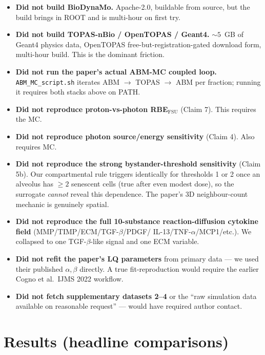 \documentclass[11pt]{article}
\begin{document}
\begin{itemize}
  \item \textbf{Did not build BioDynaMo.} Apache-2.0, buildable from
        source, but the build brings in ROOT and is multi-hour on
        first try.
  \item \textbf{Did not build TOPAS-nBio / OpenTOPAS / Geant4.} $\sim 5$~GB
        of Geant4 physics data, OpenTOPAS free-but-registration-gated
        download form, multi-hour build. This is the dominant friction.
  \item \textbf{Did not run the paper's actual ABM-MC coupled loop.}
        \texttt{ABM\_MC\_script.sh} iterates ABM $\rightarrow$ TOPAS
        $\rightarrow$ ABM per fraction; running it requires both stacks
        above on PATH.
  \item \textbf{Did not reproduce proton-vs-photon RBE$_{\mathrm{FSU}}$}
        (Claim 7). This requires the MC.
  \item \textbf{Did not reproduce photon source/energy sensitivity}
        (Claim 4). Also requires MC.
  \item \textbf{Did not reproduce the strong bystander-threshold
        sensitivity} (Claim 5b). Our compartmental rule triggers
        identically for thresholds 1 or 2 once an alveolus has $\ge 2$
        senescent cells (true after even modest dose), so the surrogate
        \emph{cannot} reveal this dependence. The paper's 3D
        neighbour-count mechanic is genuinely spatial.
  \item \textbf{Did not reproduce the full 10-substance
        reaction-diffusion cytokine field} (MMP/TIMP/ECM/TGF-$\beta$/PDGF/
        IL-13/TNF-$\alpha$/MCP1/etc.). We collapsed to one TGF-$\beta$-like
        signal and one ECM variable.
  \item \textbf{Did not refit the paper's LQ parameters} from primary
        data --- we used their published $\alpha,\beta$ directly.
        A true fit-reproduction would require the earlier Cogno et al.\
        IJMS 2022 workflow.
  \item \textbf{Did not fetch supplementary datasets 2--4} or the
        ``raw simulation data available on reasonable request'' ---
        would have required author contact.
\end{itemize}

\section{Results (headline comparisons)}
\end{document}
